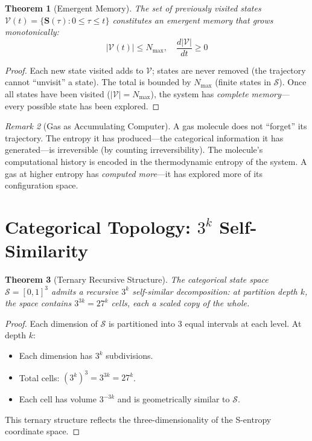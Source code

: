 \documentclass[twocolumn,10pt,a4paper]{article}
\theoremstyle{plain}
\newtheorem{theorem}{Theorem}[section]
\theoremstyle{definition}
\theoremstyle{remark}
\newtheorem{remark}[theorem]{Remark}
\newcommand{\Sspace}{\mathcal{S}}
\newcommand{\Scoord}{\mathbf{S}}
\begin{document}
\begin{theorem}[Emergent Memory]
\label{thm:memory}
The set of previously visited states $\mathcal{V}(t) = \{\Scoord(\tau) : 0 \leq \tau \leq t\}$ constitutes an emergent memory that grows monotonically:
\begin{equation}
    |\mathcal{V}(t)| \leq N_{\max}, \quad \frac{d|\mathcal{V}|}{dt} \geq 0
\end{equation}
\end{theorem}

\begin{proof}
Each new state visited adds to $\mathcal{V}$; states are never removed (the trajectory cannot ``unvisit'' a state). The total is bounded by $N_{\max}$ (finite states in $\Sspace$). Once all states have been visited ($|\mathcal{V}| = N_{\max}$), the system has \emph{complete memory}---every possible state has been explored.
\end{proof}

\begin{remark}[Gas as Accumulating Computer]
A gas molecule does not ``forget'' its trajectory. The entropy it has produced---the categorical information it has generated---is irreversible (by counting irreversibility). The molecule's computational history is encoded in the thermodynamic entropy of the system. A gas at higher entropy has \emph{computed more}---it has explored more of its configuration space.
\end{remark}

\section{Categorical Topology: $3^k$ Self-Similarity}
\label{sec:topology}

\begin{theorem}[Ternary Recursive Structure]
\label{thm:ternary}
The categorical state space $\Sspace = [0,1]^3$ admits a recursive $3^k$ self-similar decomposition: at partition depth $k$, the space contains $3^{3k} = 27^k$ cells, each a scaled copy of the whole.
\end{theorem}

\begin{proof}
Each dimension of $\Sspace$ is partitioned into 3 equal intervals at each level. At depth $k$:
\begin{itemize}
    \item Each dimension has $3^k$ subdivisions.
    \item Total cells: $(3^k)^3 = 3^{3k} = 27^k$.
    \item Each cell has volume $3^{-3k}$ and is geometrically similar to $\Sspace$.
\end{itemize}
This ternary structure reflects the three-dimensionality of the S-entropy coordinate space.
\end{proof}
\end{document}
